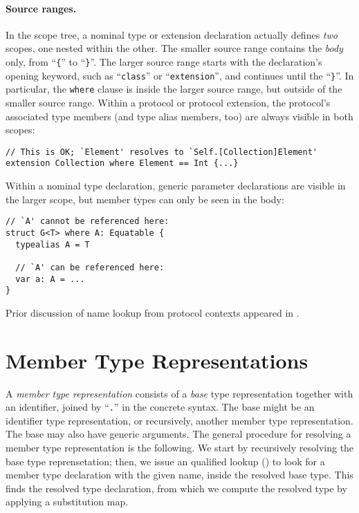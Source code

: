\documentclass[../generics]{subfiles}
\begin{document}
\paragraph{Source ranges.}
In the scope tree, a nominal type or extension declaration actually defines \emph{two} scopes, one nested within the other. The smaller source range contains the \emph{body} only, from ``\verb|{|'' to ``\verb|}|''. The larger source range starts with the declaration's opening keyword, such as ``\texttt{class}'' or ``\texttt{extension}'', and continues until the ``\verb|}|''. In particular, the \texttt{where} clause is inside the larger source range, but outside of the smaller source range. Within a protocol or protocol extension, the protocol's associated type members (and type alias members, too) are always visible in both scopes:
\begin{Verbatim}
// This is OK; `Element' resolves to `Self.[Collection]Element'
extension Collection where Element == Int {...}
\end{Verbatim}
Within a nominal type declaration, generic parameter declarations are visible in the larger scope, but member types can only be seen in the body:
\begin{Verbatim}
// `A' cannot be referenced here:
struct G<T> where A: Equatable {  
  typealias A = T

  // `A' can be referenced here:
  var a: A = ...
}
\end{Verbatim}
Prior discussion of name lookup from protocol contexts appeared in .

\section{Member Type Representations}\label{member type repr}

A \emph{member type representation} consists of a \emph{base} type representation together with an identifier, joined by ``\verb|.|'' in the concrete syntax. The base might be an identifier type representation, or recursively, another member type representation. The base may also have generic arguments. The general procedure for resolving a member type representation is the following. We start by recursively resolving the base type reprensetation; then, we issue an qualified lookup () to look for a member type declaration with the given name, inside the resolved base type. This finds the resolved type declaration, from which we compute the resolved type by applying a substitution map.
\end{document}
